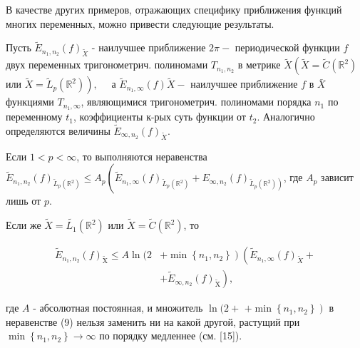 \documentclass[10pt]{article}
\begin{document}
В качестве других примеров, отражающих специфику приближения функций многих переменных, можно привести следующие результаты.



Пусть $\tilde{E}_{n_{1}, n_{2}}(f)_{\tilde{X}}$ - наилучшее приближение $2 \pi-$ периодической функции $f$ двух переменных тригонометрич. полиномами $T_{n_{1}, n_{2}}$ в метрике $\tilde{X}\left(\tilde{X}=\tilde{C}\left(\mathbb{R}^{2}\right)\right.$ или $\left.\tilde{X}=\tilde{L}_{p}\left(\mathbb{R}^{2}\right)\right), \quad$ а $\tilde{E}_{n_{1}, \infty}(f) \tilde{X}-$ наилучшее приближение $f$ в $\bar{X}$ функциями $T_{n_{1}, \infty}$, являющимися тригонометрич. полиномами порядка $n_{1}$ по переменному $t_{1}$, коэффициенты к-рых суть функции от $t_{2}$. Аналогично определяются величины $\tilde{E}_{\infty, n_{2}}(f)_{\tilde{X}}$.



Если $1<p<\infty$, то выполняются неравенства $\tilde{E}_{n_{1}, n_{2}}(f)_{\tilde{L}_{p}\left(\mathbb{R}^{2}\right)} \leqslant A_{p}\left(\tilde{E}_{n_{1}, \infty}(f)_{\tilde{L}_{p}\left(\mathbb{R}^{2}\right)}+E_{\infty, n_{2}}(f)_{\left.\tilde{L}_{p}\left(\mathbb{R}^{2}\right)\right)}\right.$, где $A_{p}$ зависит лишь от $p$.



Если же $\tilde{X}=\tilde{L_{1}}\left(\mathbb{R}^{2}\right)$ или $\tilde{X}=\tilde{C}\left(\mathbb{R}^{2}\right)$, то



\[

\begin{aligned}

\tilde{E}_{n_{1}, n_{2}}(f)_{\tilde{\mathrm{X}}} \leqslant A \ln (2 & \left.+\min \left\{n_{1}, n_{2}\right\}\right)\left(\tilde{E}_{n_{1}, \infty}(f)_{\tilde{X}}+\right. \\

& \left.+\tilde{E}_{\infty, n_{2}}(f)_{\tilde{\mathrm{X}}}\right),

\end{aligned}

\]



где $A$ - абсолютная постоянная, и множитель $\ln (2+$ $\left.+\min \left\{n_{1}, n_{2}\right\}\right)$ в неравенстве (9) нельзя заменить ни на какой другой, растущий при $\min \left\{n_{1}, n_{2}\right\} \rightarrow \infty$ по порядку медленнее (см. [15]).
\end{document}
